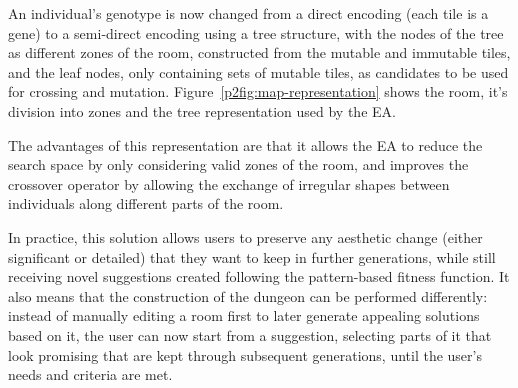 An individual's genotype is now changed from a direct encoding (each tile is a gene) to a semi-direct encoding using a tree structure, with the nodes of the tree as different zones of the room, constructed from the mutable and immutable tiles, and the leaf nodes, only containing sets of mutable tiles, as candidates to be used for crossing and mutation. Figure~\ref{p2fig:map-representation} shows the room, it's division into zones and the tree representation used by the EA. 

The advantages of this representation are that it allows the EA to reduce the search space by only considering valid zones of the room, and improves the crossover operator by allowing the exchange of irregular shapes between individuals along different parts of the room.


In practice, this solution allows users to preserve any aesthetic change (either significant or detailed) that they want to keep in further generations, while still receiving novel suggestions created following the pattern-based fitness function. It also means that the construction of the dungeon can be performed differently: instead of manually editing a room first to later generate appealing solutions based on it, the user can now start from a suggestion, selecting parts of it that look promising that are kept through subsequent generations, until the user's needs and criteria are met.


